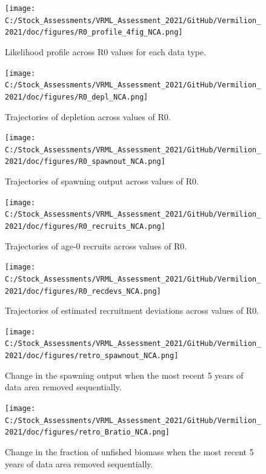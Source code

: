 \documentclass[
  english,
  a4paper,
]{article}
\begin{document}
\begin{figure}
\centering
\texttt{[image: C:/Stock\_Assessments/VRML\_Assessment\_2021/GitHub/Vermilion\_2021/doc/figures/R0\_profile\_4fig\_NCA.png]}
\caption{Likelihood profile across R0 values for each data type.\label{fig:r0-profile}}
\end{figure}

\begin{figure}
\centering
\texttt{[image: C:/Stock\_Assessments/VRML\_Assessment\_2021/GitHub/Vermilion\_2021/doc/figures/R0\_depl\_NCA.png]}
\caption{Trajectories of depletion across values of R0.\label{fig:r0-depl}}
\end{figure}

\begin{figure}
\centering
\texttt{[image: C:/Stock\_Assessments/VRML\_Assessment\_2021/GitHub/Vermilion\_2021/doc/figures/R0\_spawnout\_NCA.png]}
\caption{Trajectories of spawning output across values of R0.\label{fig:r0-spawn}}
\end{figure}

\begin{figure}
\centering
\texttt{[image: C:/Stock\_Assessments/VRML\_Assessment\_2021/GitHub/Vermilion\_2021/doc/figures/R0\_recruits\_NCA.png]}
\caption{Trajectories of age-0 recruits across values of R0.\label{fig:r0-recruits}}
\end{figure}

\begin{figure}
\centering
\texttt{[image: C:/Stock\_Assessments/VRML\_Assessment\_2021/GitHub/Vermilion\_2021/doc/figures/R0\_recdevs\_NCA.png]}
\caption{Trajectories of estimated recruitment deviations across values of R0.\label{fig:r0-recdevs}}
\end{figure}

\begin{figure}
\centering
\texttt{[image: C:/Stock\_Assessments/VRML\_Assessment\_2021/GitHub/Vermilion\_2021/doc/figures/retro\_spawnout\_NCA.png]}
\caption{Change in the spawning output when the most recent 5 years of data area removed sequentially.\label{fig:retro-spawnb}}
\end{figure}

\begin{figure}
\centering
\texttt{[image: C:/Stock\_Assessments/VRML\_Assessment\_2021/GitHub/Vermilion\_2021/doc/figures/retro\_Bratio\_NCA.png]}
\caption{Change in the fraction of unfished biomass when the most recent 5 years of data area removed sequentially.\label{fig:retro-bratio}}
\end{figure}
\end{document}
